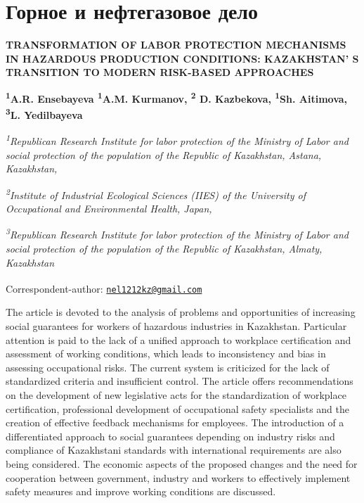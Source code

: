 \newpage
\let\cleardoublepage\clearpage
\chapter{Горное и нефтегазовое дело}

\begin{articleheader}
{\bfseries TRANSFORMATION OF LABOR PROTECTION MECHANISMS IN HAZARDOUS
PRODUCTION CONDITIONS: KAZAKHSTAN' S TRANSITION TO MODERN
RISK-BASED APPROACHES}

{\bfseries
\textsuperscript{1}A.R. Ensebayeva\textsuperscript{\envelope }\authorid
\textsuperscript{1}A.M. Kurmanov\authorid,
\textsuperscript{2} D. Kazbekova\authorid,
\textsuperscript{1}Sh. Aitimova\authorid,
\textsuperscript{3}L. Yedilbayeva\authorid}
\end{articleheader}

\begin{affiliation}
\emph{\textsuperscript{1}Republican Research Institute for labor
protection of the Ministry of Labor and social protection of the
population of the Republic of Kazakhstan, Astana, Kazakhstan,}

\emph{\textsuperscript{2}Institute of Industrial Ecological Sciences
(IIES) of the University of Occupational and Environmental Health,
Japan,}

\emph{\textsuperscript{3}Republican Research Institute for labor
protection of the Ministry of Labor and social protection of the
population of the Republic of Kazakhstan, Almaty, Kazakhstan}

\raggedright \textsuperscript{\envelope }Correspondent-author: \href{mailto:nel1212kz@gmail.com}{\nolinkurl{nel1212kz@gmail.com}}
\end{affiliation}

The article is devoted to the analysis of problems and opportunities of
increasing social guarantees for workers of hazardous industries in
Kazakhstan. Particular attention is paid to the lack of a unified
approach to workplace certification and assessment of working
conditions, which leads to inconsistency and bias in assessing
occupational risks. The current system is criticized for the lack of
standardized criteria and insufficient control. The article offers
recommendations on the development of new legislative acts for the
standardization of workplace certification, professional development of
occupational safety specialists and the creation of effective feedback
mechanisms for employees. The introduction of a differentiated approach
to social guarantees depending on industry risks and compliance of
Kazakhstani standards with international requirements are also being
considered. The economic aspects of the proposed changes and the need
for cooperation between government, industry and workers to effectively
implement safety measures and improve working conditions are discussed.

